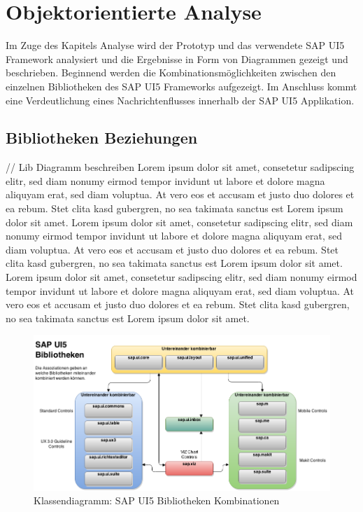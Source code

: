 \section{Objektorientierte Analyse}\label{analyse}
Im Zuge des Kapitels Analyse wird der Prototyp und das verwendete SAP UI5 Framework analysiert und die Ergebnisse in Form von Diagrammen gezeigt und beschrieben. Beginnend werden die Kombinationsmöglichkeiten zwischen den einzelnen Bibliotheken des SAP UI5 Frameworks aufgezeigt. Im Anschluss kommt eine Verdeutlichung eines Nachrichtenflusses innerhalb der SAP UI5 Applikation.

\subsection{Bibliotheken Beziehungen}
// Lib Diagramm beschreiben
Lorem ipsum dolor sit amet, consetetur sadipscing elitr, sed diam nonumy eirmod tempor invidunt ut labore et dolore magna aliquyam erat, sed diam voluptua. At vero eos et accusam et justo duo dolores et ea rebum. Stet clita kasd gubergren, no sea takimata sanctus est Lorem ipsum dolor sit amet. Lorem ipsum dolor sit amet, consetetur sadipscing elitr, sed diam nonumy eirmod tempor invidunt ut labore et dolore magna aliquyam erat, sed diam voluptua. At vero eos et accusam et justo duo dolores et ea rebum. Stet clita kasd gubergren, no sea takimata sanctus est Lorem ipsum dolor sit amet. Lorem ipsum dolor sit amet, consetetur sadipscing elitr, sed diam nonumy eirmod tempor invidunt ut labore et dolore magna aliquyam erat, sed diam voluptua. At vero eos et accusam et justo duo dolores et ea rebum. Stet clita kasd gubergren, no sea takimata sanctus est Lorem ipsum dolor sit amet. 

\vspace{1em}
\begin{figure}[htb]
  \centering
  \includegraphics[width=1\linewidth]{abb/sapui5libconnections}
  \caption[Klassendiagramm: SAP UI5 Bibliotheken Kombinationen]{Klassendiagramm: SAP UI5 Bibliotheken Kombinationen}
  \label{fig:sapui5libconnections}
\end{figure}

